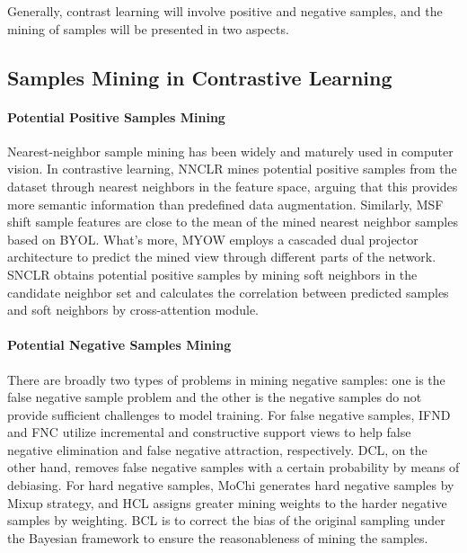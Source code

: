 \documentclass[review]{elsarticle}
\begin{document}
Generally, contrast learning will involve positive and negative samples, and the mining of samples will be presented in two aspects.

\subsection{Samples Mining in Contrastive Learning}
\paragraph{Potential Positive Samples Mining}
Nearest-neighbor sample mining has been widely and maturely used in computer vision. In contrastive learning, NNCLR\cite{b12} mines potential positive samples from the dataset through nearest neighbors in the feature space, arguing that this provides more semantic information than predefined data augmentation. Similarly, MSF\cite{b13} shift sample features are close to the mean of the mined nearest neighbor samples based on BYOL\cite{b6}. What's more, MYOW\cite{b14} employs a cascaded dual projector architecture to predict the mined view through different parts of the network. SNCLR\cite{b15} obtains potential positive samples by mining soft neighbors in the candidate neighbor set and calculates the correlation between predicted samples and soft neighbors by cross-attention module.

\paragraph{Potential Negative Samples Mining}
There are broadly two types of problems in mining negative samples: one is the false negative sample problem and the other is the negative samples do not provide sufficient challenges to model training. For false negative samples, IFND\cite{b16} and FNC\cite{b17} utilize incremental and constructive support views to help false negative elimination and false negative attraction, respectively. DCL\cite{b19}, on the other hand, removes false negative samples with a certain probability by means of debiasing. For hard negative samples, MoChi\cite{b18} generates hard negative samples by Mixup strategy, and HCL\cite{b20} assigns greater mining weights to the harder negative samples by weighting. BCL\cite{b21} is to correct the bias of the original sampling under the Bayesian framework to ensure the reasonableness of mining the samples.
\end{document}
